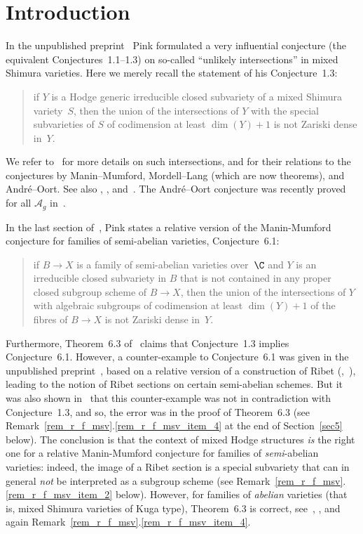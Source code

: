\section{Introduction}
In the unpublished preprint~\cite{Pink2} Pink formulated a very
influential conjecture (the equivalent Conjectures~1.1--1.3) on
so-called ``unlikely intersections'' in mixed Shimura varieties.
Here we merely recall the statement of his Conjecture~1.3:
\begin{quote}
if $Y$ is a Hodge generic irreducible closed subvariety of a mixed
Shimura variety~$S$, then the union of the intersections of $Y$ with
the special subvarieties of $S$ of codimension at least $\dim(Y)+1$
is not Zariski dense in~$Y$.
\end{quote}
We refer to~\cite{Zannier} for more details on such intersections, and
for their relations to the conjectures by Manin--Mumford,
Mordell--Lang (which are now theorems), and André--Oort. See also
\cite{Pink2}, \cite{Pink1}, and~\cite{KUY}. The André--Oort
conjecture was recently proved for all $\mathcal{A}_g$
in~\cite{Tsimerman}.

In the last section of~\cite{Pink2}, Pink states a relative version of
the Manin-Mumford conjecture for families of semi-abelian varieties,
Conjecture~6.1:
\begin{quote}
if $B\to X$ is a family of semi-abelian varieties over~$\C$ and $Y$
is an irreducible closed subvariety in $B$ that is not contained in
any proper closed subgroup scheme of $B\to X$, then the union of the
intersections of $Y$ with algebraic subgroups of
codimension at least $\dim(Y)+1$ of the fibres of $B\to X$ is not
Zariski dense in~$Y$.
\end{quote}
Furthermore, Theorem~6.3 of~\cite{Pink2} claims that Conjecture~1.3
implies Conjecture~6.1. However, a counter-example to Conjecture~6.1
was given in the unpublished preprint~\cite{Bertrand11}, based on a
relative version of a construction of Ribet
(\cite{Jacquinot-Ribet},~\cite{Ribet}), leading to the notion of Ribet
sections on certain semi-abelian schemes. But it was also shown
in~\cite{Bertrand11} that this counter-example was not in
contradiction with Conjecture~1.3, and so, the error was in the proof
of Theorem~6.3 (see
Remark~\ref{rem_r_f_msv}.\ref{rem_r_f_msv_item_4} at the end of
Section~\ref{sec5} below). The conclusion is
that the context of mixed Hodge structures \emph{is} the right one for
a relative Manin-Mumford conjecture for families of
\emph{semi}-abelian varieties: indeed, the image of a Ribet section is
a special subvariety that can in general \emph{not} be interpreted as
a subgroup scheme (see
Remark~\ref{rem_r_f_msv}.\ref{rem_r_f_msv_item_2} below). However, for
families of \emph{abelian} varieties (that is, mixed Shimura varieties
of Kuga type), Theorem~6.3 is correct, see~\cite[Prop.\,4.6]{Pink1}, \cite[Prop.\,3.4]{Gao-Pisa}, and again
Remark~\ref{rem_r_f_msv}.\ref{rem_r_f_msv_item_4}.

